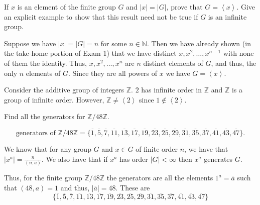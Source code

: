 \documentclass[12 pt, letterpaper]{hmcpset}
\begin{document}
\begin{problem}
	If $x$ is an element of the finite group $G$ and $\lvert x \rvert = \lvert G \rvert$, prove that $G = \left < x \right >$. Give an explicit example to show that this result need not be true if $G$ is an infinite group.
\end{problem}

\begin{solution}
	Suppose we have $\lvert x \rvert = \lvert G \rvert = n$ for some $n \in \mathbb{N}$. Then we have already shown (in the take-home portion of Exam 1) that we have distinct $x, x^{2}, \dots, x^{n - 1}$ with none of them the identity. Thus, $x, x^{2}, \dots, x^{n}$ are $n$ distinct elements of $G$, and thus, the only $n$ elements of $G$. Since they are all powers of $x$ we have $G = \left < x \right >$. 

	Consider the additive group of integers $\mathbb{Z}$. $2$ has infinite order in $\mathbb{Z}$ and $\mathbb{Z}$ is a group of infinite order. However, $\mathbb{Z} \neq \left < 2 \right >$ since $1 \notin \left < 2 \right >$.
\end{solution}

\pagebreak

\begin{problem}
	Find all the generators for $\mathbb{Z}/48 \mathbb{Z}$.
\end{problem}

\begin{solution}
	\[
		\boxed{
			\text{generators of } \mathbb{Z}/48 \mathbb{Z} = \{ \overline{1}, \overline{5}, \overline{7}, \overline{11}, \overline{13}, \overline{17}, \overline{19}, \overline{23}, \overline{25}, \overline{29}, \overline{31}, \overline{35}, \overline{37}, \overline{41}, \overline{43}, \overline{47} \}.
		}
	\]

	We know that for any group $G$ and $x \in G$ of finite order $n$, we have that $\lvert x^{a} \rvert = \frac{n}{(n, a)}$. We also have that if $x^{a}$ has order $\lvert G \rvert < \infty$ then $x^{a}$ generates $G$. 

	Thus, for the finite group $\mathbb{Z}/48\mathbb{Z}$ the generators are all the elements $1^{a} = \overline{a}$ such that $(48, a) = 1$ and thus, $\lvert \overline{a} \rvert = 48$. These are
	\[
		\{ \overline{1}, \overline{5}, \overline{7}, \overline{11}, \overline{13}, \overline{17}, \overline{19}, \overline{23}, \overline{25}, \overline{29}, \overline{31}, \overline{35}, \overline{37}, \overline{41}, \overline{43}, \overline{47} \}
	\]
\end{solution}
\end{document}

